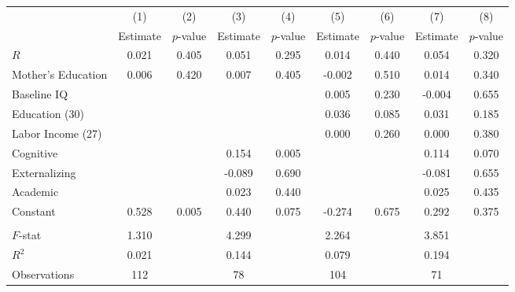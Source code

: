 \begin{tabular}{lcccccccc} \toprule
 & (1) & (2) & (3) & (4) & (5) & (6) & (7) & (8) \\ 
 & Estimate  & $p$-value  & Estimate  & $p$-value  & Estimate  & $p$-value  & Estimate  & $p$-value  \\  \midrule
$R$ &     0.021 &     0.405 &     0.051 &     0.295 &     0.014 &     0.440 &     0.054 &     0.320 \\  
Mother's Education &     0.006 &     0.420 &     0.007 &     0.405 &    -0.002 &     0.510 &     0.014 &     0.340 \\  
Baseline IQ &         &         &         &         &     0.005 &     0.230 &    -0.004 &     0.655 \\  
Education (30) &         &         &         &         &     0.036 &     0.085 &     0.031 &     0.185 \\  
Labor Income (27) &         &         &         &         &     0.000 &     0.260 &     0.000 &     0.380 \\  
Cognitive &         &         &     0.154 &     0.005 &         &         &     0.114 &     0.070 \\  
Externalizing &         &         &    -0.089 &     0.690 &         &         &    -0.081 &     0.655 \\  
Academic &         &         &     0.023 &     0.440 &         &         &     0.025 &     0.435 \\  
Constant &     0.528 &     0.005 &     0.440 &     0.075 &    -0.274 &     0.675 &     0.292 &     0.375 \\ \\ \midrule
$F$-stat &     1.310 &         &     4.299 &         &     2.264 &         &     3.851 &         \\  
$R^2$ &     0.021 &         &     0.144 &         &     0.079 &         &     0.194 &         \\  
Observations &   112 &         &    78 &         &   104 &         &    71 &         \\  
\bottomrule
\end{tabular}

